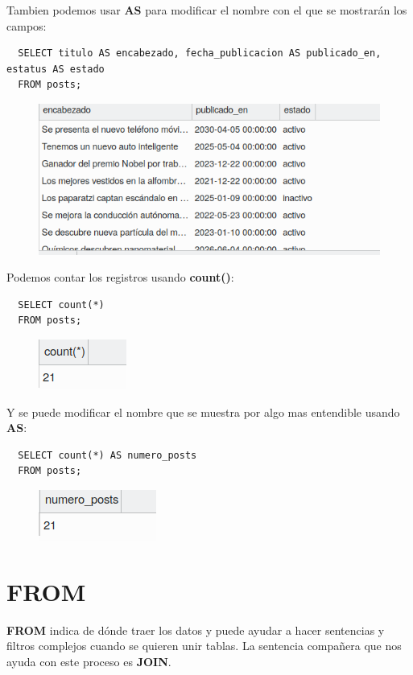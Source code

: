 \documentclass{article}
\begin{document}
Tambien podemos usar \textbf{AS} para modificar el nombre con el que se mostrarán los campos:
\begin{verbatim}
  SELECT titulo AS encabezado, fecha_publicacion AS publicado_en, estatus AS estado
  FROM posts;
\end{verbatim}
\begin{figure}[h!]
  \centering
  \includegraphics[scale=0.55]{./Pictures/081_select_as.png}
\end{figure}

\newpage

Podemos contar los registros usando \textbf{count()}:
\begin{verbatim}
  SELECT count(*)
  FROM posts;
\end{verbatim}
\begin{figure}[h!]
  \centering
  \includegraphics[scale=0.75]{./Pictures/082_select_count.png}
\end{figure}


Y se puede modificar el nombre que se muestra por algo mas entendible usando
\textbf{AS}:
\begin{verbatim}
  SELECT count(*) AS numero_posts
  FROM posts;
\end{verbatim}
\begin{figure}[h!]
  \centering
  \includegraphics[scale=0.75]{./Pictures/083_select_count_as.png}
\end{figure}


\section{FROM}%
\textbf{FROM} indica de dónde traer los datos y puede ayudar a hacer sentencias
y filtros complejos cuando se quieren unir tablas. La sentencia compañera que
nos ayuda con este proceso es \textbf{JOIN}.\\
\end{document}
